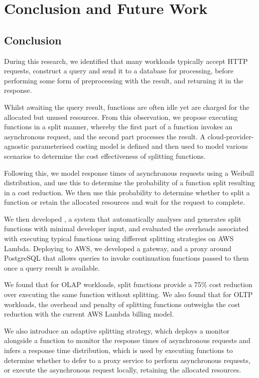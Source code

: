 \chapter{Conclusion and Future Work}
\label{chap:conclusion}
\section{Conclusion}
During this research, we identified that many \faas{} workloads typically accept HTTP requests, construct a query and send it to a database for processing, before performing some form of preprocessing with the result, and returning it in the response.

Whilst awaiting the query result, functions are often idle yet are charged for the allocated but unused resources. From this observation, we propose executing functions in a split manner, whereby the first part of a function invokes an asynchronous request, and the second part processes the result. A cloud-provider-agnostic parameterised costing model is defined and then used to model various scenarios to determine the cost effectiveness of splitting functions.

Following this, we model response times of asynchronous requests using a Weibull distribution, and use this to determine the probability of a function split resulting in a cost reduction. We then use this probability to determine whether to split a function or retain the allocated resources and wait for the request to complete.

We then developed \faaasc{}, a system that automatically analyses and generates split \js{} \faas{} functions with minimal developer input, and evaluated the overheads associated with executing typical functions using different splitting strategies on AWS Lambda. Deploying to AWS, we developed a gateway, and a proxy around PostgreSQL that allows queries to invoke continuation functions passed to them once a query result is available.

We found that for OLAP workloads, split functions provide a 75\% cost reduction over executing the same function without splitting. We also found that for OLTP workloads, the overhead and penalty of splitting functions outweighs the cost reduction with the current AWS Lambda billing model.

We also introduce an adaptive splitting strategy, which deploys a monitor alongside a \faas{} function to monitor the response times of asynchronous requests and infers a response time distribution, which is used by executing functions to determine whether to defer to a proxy service to perform asynchronous requests, or execute the asynchronous request locally, retaining the allocated resources.

